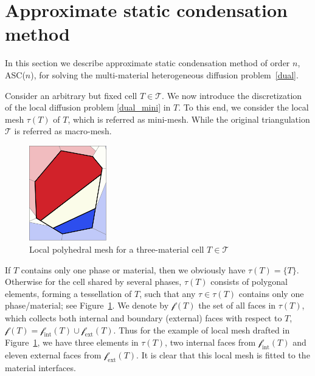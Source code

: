 \documentclass[12pt]{article}
\newcommand{\vect}[1]{\boldsymbol{\mathbf{#1}}}
\newcommand{\bcell}{T}
\newcommand{\bmesh}{{\vect{\mathcal T}}}
\newcommand{\mmesh}{{\vect{\mathcal \tau}}}
\newcommand{\mfaces}[1][]{{\vect{\mathcal f}_{\text{#1}}}}
\begin{document}
	\section{Approximate static condensation method} \label{sec:ASC}
	
	In this section we describe  approximate static condensation method of order $n$, ASC($n$), for solving the multi-material heterogeneous diffusion problem~\eqref{dual}.
	
	Consider an arbitrary but fixed cell $T\in\bmesh$. We now introduce the discretization of the local diffusion problem \eqref{dual_mini} in $T$. To this end, we consider the local mesh $\mmesh(T)$ of $T$, which is referred as mini-mesh. While the original triangulation $\bmesh$ is referred as macro-mesh.
	\begin{figure}
		\vspace{-10pt}
		\begin{center}
			\includegraphics[width=0.3\textwidth]{./ring_mini_voronoi_cell.png}%
			\caption{Local polyhedral mesh for a three-material cell $T\in\bmesh$ \label{fig:mmesh}}
		\end{center}
		\vspace{-15pt}
		\vspace{1pt}
	\end{figure}
	If $T$ contains only one phase or material, then we obviously have $\mmesh(T) = \{\bcell\}$. Otherwise for the cell shared by several phases, $\mmesh(T)$ consists of polygonal elements, forming a tessellation of $T$, such that any ${\tau \in \mmesh(T)}$ contains only one phase/material; see Figure~\ref{fig:mmesh}. We denote by $\mfaces(T)$ the set of all faces in $\mmesh(T)$, which collects both   internal and boundary (external) faces with respect to $T$,  $\mfaces(T) = \mfaces[int](T) \cup \mfaces[ext](T)$. Thus for the example of local mesh drafted in Figure~\ref{fig:mmesh}, we have three elements in $\mmesh(T)$, two internal faces from $\mfaces[int](T)$ and eleven external faces from $\mfaces[ext](T)$. It is clear that this local mesh is fitted to the material interfaces.
	
\end{document}
